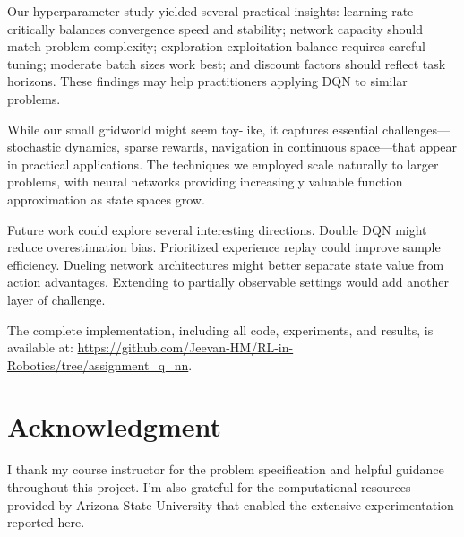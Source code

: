 \documentclass[conference]{IEEEtran}
\begin{document}
Our hyperparameter study yielded several practical insights: learning rate critically balances convergence speed and stability; network capacity should match problem complexity; exploration-exploitation balance requires careful tuning; moderate batch sizes work best; and discount factors should reflect task horizons. These findings may help practitioners applying DQN to similar problems.

While our small gridworld might seem toy-like, it captures essential challenges—stochastic dynamics, sparse rewards, navigation in continuous space—that appear in practical applications. The techniques we employed scale naturally to larger problems, with neural networks providing increasingly valuable function approximation as state spaces grow.

Future work could explore several interesting directions. Double DQN \cite{van2016deep} might reduce overestimation bias. Prioritized experience replay \cite{schaul2015prioritized} could improve sample efficiency. Dueling network architectures \cite{wang2016dueling} might better separate state value from action advantages. Extending to partially observable settings would add another layer of challenge.

The complete implementation, including all code, experiments, and results, is available at: \url{https://github.com/Jeevan-HM/RL-in-Robotics/tree/assignment_q_nn}.

\section*{Acknowledgment}

I thank my course instructor for the problem specification and helpful guidance throughout this project. I'm also grateful for the computational resources provided by Arizona State University that enabled the extensive experimentation reported here.
\end{document}

